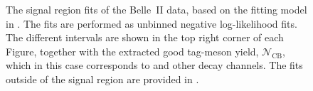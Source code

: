 \begin{figure}[hbtp!]
{    }
    \caption{\label{fig:data_fits_signal}
    The \EB signal region fits of the Belle~II data, based on the fitting model in .
    The fits are performed as unbinned negative log-likelihood fits.
    The different \EB intervals are shown in the top right corner of each Figure, 
    together with the extracted good tag-\B meson yield, $\mathcal{N}_{\mathrm{CB}}$, which in this case corresponds to \BtoXsdgamma and other \BB decay channels.
    The fits outside of the signal region are provided in .
    }
\end{figure}

